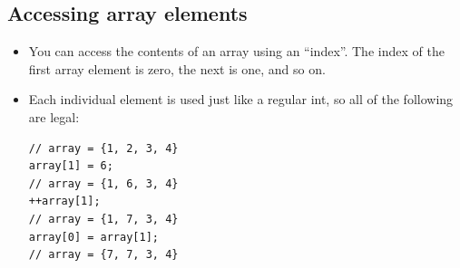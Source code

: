 \subsection{Accessing array elements}
\begin{itemize}
	\item You can access the contents of an array using an ``index''. The index of the first array element is zero, the next is one, and so on.
	\item Each individual element is used just like a regular int, so all of the following are legal:
\begin{lstlisting}[style=C++]
// array = {1, 2, 3, 4}
array[1] = 6;
// array = {1, 6, 3, 4}
++array[1];
// array = {1, 7, 3, 4}
array[0] = array[1];
// array = {7, 7, 3, 4}
\end{lstlisting}
\end{itemize}


